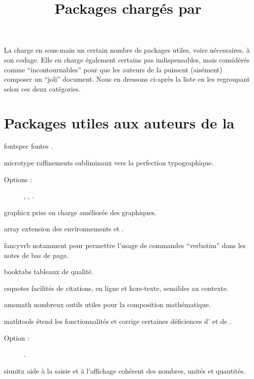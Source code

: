 \documentclass{letgut}
\begin{document}
\title{Packages chargés par }
\label{sec:packages-charges-par}

La  charge en sous-main un certain nombre de packages utiles, voire
nécessaires, à son codage. Elle en charge également certains pas indispensables,
mais considérés comme \enquote{incontournables} pour que les auteurs de la
 puissent (aisément) composer un \enquote{joli} document. Nous en
dressons ci-après la liste en les regroupant selon ces deux catégories.

\section{Packages utiles aux auteurs de la }
\label{sec:utiles-aux-auteurs}

\begin{ctannews}
\item[fontspec] fontes \otf{}.
\item[microtype] raffinements subliminaux vers la perfection typographique.
  \begin{description}
  \item[Options :] , ,
    .
  \end{description}
\item[graphicx] prise en charge améliorée des graphiques.
\item[array] extension des environnements  et
  .
\item[fancyvrb] notamment pour permettre l'usage de commandes \enquote{verbatim}
  dans les notes de bas de page.
\item[booktabs] tableaux de qualité.
\item[csquotes] facilités de citations, en ligne et hors-texte, sensibles au
  contexte.
\item[amsmath] nombreux outils utiles pour la composition mathématique.
\item[mathtools] étend les fonctionnalités et corrige certaines déficiences
  d' et de .
  \begin{description}
  \item[Option :] .
  \end{description}
\item[siunitx] aide à la saisie et à l'affichage cohérent des nombres, unités et
  quantités.
  \begin{description}

\end{description}
\end{ctannews}
\end{document}
